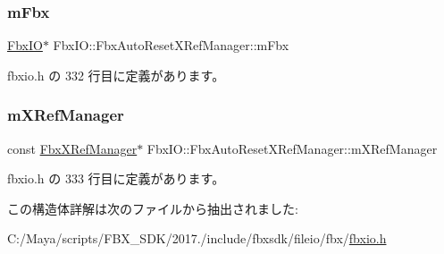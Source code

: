 \subsubsection{\texorpdfstring{m\+Fbx}{mFbx}}
{\footnotesize\ttfamily \hyperlink{class_fbx_i_o}{Fbx\+IO}$\ast$ Fbx\+I\+O\+::\+Fbx\+Auto\+Reset\+X\+Ref\+Manager\+::m\+Fbx}



 fbxio.\+h の 332 行目に定義があります。

\mbox{\label{struct_fbx_i_o_1_1_fbx_auto_reset_x_ref_manager_a65b41fef18ebe8d10db3dafe69cca132}} 
\subsubsection{\texorpdfstring{m\+X\+Ref\+Manager}{mXRefManager}}
{\footnotesize\ttfamily const \hyperlink{class_fbx_x_ref_manager}{Fbx\+X\+Ref\+Manager}$\ast$ Fbx\+I\+O\+::\+Fbx\+Auto\+Reset\+X\+Ref\+Manager\+::m\+X\+Ref\+Manager}



 fbxio.\+h の 333 行目に定義があります。



この構造体詳解は次のファイルから抽出されました\+:\begin{DoxyCompactItemize}
\item 
C\+:/\+Maya/scripts/\+F\+B\+X\+\_\+\+S\+D\+K/2017./include/fbxsdk/fileio/fbx/\hyperlink{fbxio_8h}{fbxio.\+h}\end{DoxyCompactItemize}
